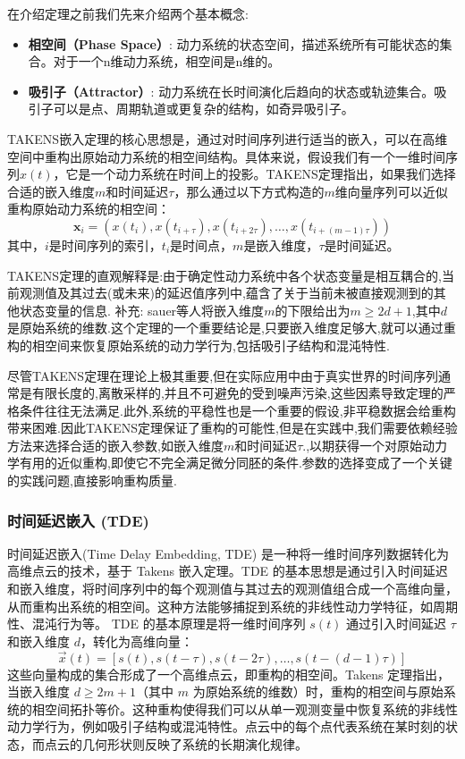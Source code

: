 在介绍定理之前我们先来介绍两个基本概念:
\begin{itemize}
    \item \textbf{相空间（Phase Space）}: 动力系统的状态空间，描述系统所有可能状态的集合。对于一个n维动力系统，相空间是n维的。
    \item \textbf{吸引子（Attractor）}: 动力系统在长时间演化后趋向的状态或轨迹集合。吸引子可以是点、周期轨道或更复杂的结构，如奇异吸引子。
\end{itemize}
TAKENS嵌入定理的核心思想是，通过对时间序列进行适当的嵌入，可以在高维空间中重构出原始动力系统的相空间结构。具体来说，假设我们有一个一维时间序列$x(t)$，它是一个动力系统在时间上的投影。TAKENS定理指出，如果我们选择合适的嵌入维度$m$和时间延迟$\tau$，那么通过以下方式构造的$m$维向量序列可以近似重构原始动力系统的相空间：
\begin{equation}
    \mathbf{x}_i = (x(t_i), x(t_{i+\tau}), x(t_{i+2\tau}), \ldots, x(t_{i+(m-1)\tau}))
\end{equation}
其中，$i$是时间序列的索引，$t_i$是时间点，$m$是嵌入维度，$\tau$是时间延迟。

TAKENS定理的直观解释是:由于确定性动力系统中各个状态变量是相互耦合的,当前观测值及其过去(或未来)的延迟值序列中,蕴含了关于当前未被直接观测到的其他状态变量的信息.
补充: sauer等人将嵌入维度$m$的下限给出为$m\geq 2d+1$,其中$d$是原始系统的维数.这个定理的一个重要结论是,只要嵌入维度足够大,就可以通过重构的相空间来恢复原始系统的动力学行为,包括吸引子结构和混沌特性.

尽管TAKENS定理在理论上极其重要,但在实际应用中由于真实世界的时间序列通常是有限长度的,离散采样的,并且不可避免的受到噪声污染,这些因素导致定理的严格条件往往无法满足.此外,系统的平稳性也是一个重要的假设,非平稳数据会给重构带来困难.因此TAKENS定理保证了重构的可能性,但是在实践中,我们需要依赖经验方法来选择合适的嵌入参数,如嵌入维度$m$和时间延迟$\tau$.,以期获得一个对原始动力学有用的近似重构,即使它不完全满足微分同胚的条件.参数的选择变成了一个关键的实践问题,直接影响重构质量.



\subsubsection{时间延迟嵌入 (TDE)}
时间延迟嵌入(Time Delay Embedding, TDE) 是一种将一维时间序列数据转化为高维点云的技术，基于 Takens 嵌入定理。TDE 的基本思想是通过引入时间延迟和嵌入维度，将时间序列中的每个观测值与其过去的观测值组合成一个高维向量，从而重构出系统的相空间。这种方法能够捕捉到系统的非线性动力学特征，如周期性、混沌行为等。
TDE 的基本原理是将一维时间序列 \( s(t) \) 通过引入时间延迟 \( \tau \) 和嵌入维度 \( d \)，转化为高维向量：
\begin{equation}
\vec{x}(t) = \left[ s(t), s(t - \tau), s(t - 2\tau), \dots, s(t - (d - 1)\tau) \right]
\end{equation}
这些向量构成的集合形成了一个高维点云，即重构的相空间。Takens 定理指出，当嵌入维度 \( d \geq 2m + 1 \)（其中 \( m \) 为原始系统的维数）时，重构的相空间与原始系统的相空间拓扑等价。这种重构使得我们可以从单一观测变量中恢复系统的非线性动力学行为，例如吸引子结构或混沌特性。点云中的每个点代表系统在某时刻的状态，而点云的几何形状则反映了系统的长期演化规律。


